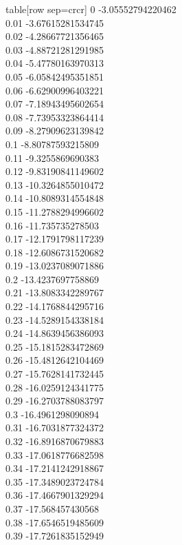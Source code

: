   table[row sep=crcr]{%
0	-3.05552794220462\\
0.01	-3.67615281534745\\
0.02	-4.28667721356465\\
0.03	-4.88721281291985\\
0.04	-5.47780163970313\\
0.05	-6.05842495351851\\
0.06	-6.62900996403221\\
0.07	-7.18943495602654\\
0.08	-7.73953323864414\\
0.09	-8.27909623139842\\
0.1	-8.80787593215809\\
0.11	-9.3255869690383\\
0.12	-9.83190841149602\\
0.13	-10.3264855010472\\
0.14	-10.8089314554848\\
0.15	-11.2788294996602\\
0.16	-11.735735278503\\
0.17	-12.1791798117239\\
0.18	-12.6086731520682\\
0.19	-13.0237089071886\\
0.2	-13.4237697758869\\
0.21	-13.8083342289767\\
0.22	-14.1768844295716\\
0.23	-14.5289154338184\\
0.24	-14.8639456386093\\
0.25	-15.1815283472869\\
0.26	-15.4812642104469\\
0.27	-15.7628141732445\\
0.28	-16.0259124341775\\
0.29	-16.2703788083797\\
0.3	-16.4961298090894\\
0.31	-16.7031877324372\\
0.32	-16.8916870679883\\
0.33	-17.0618776682598\\
0.34	-17.2141242918867\\
0.35	-17.3489023724784\\
0.36	-17.4667901329294\\
0.37	-17.568457430568\\
0.38	-17.6546519485609\\
0.39	-17.7261835152949\\
}
